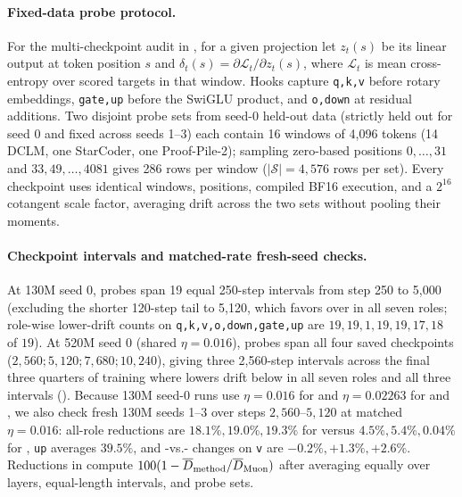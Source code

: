 \paragraph{Fixed-data probe protocol.}
For the multi-checkpoint audit in , for a given projection let $z_t(s)$ be its linear output at token position $s$ and $\delta_t(s)=\partial\mathcal L_t/\partial z_t(s)$, where $\mathcal L_t$ is mean cross-entropy over scored targets in that window. Hooks capture \texttt{q,k,v} before rotary embeddings, \texttt{gate,up} before the SwiGLU product, and \texttt{o,down} at residual additions. Two disjoint probe sets from seed-0 held-out data (strictly held out for seed 0 and fixed across seeds 1--3) each contain 16 windows of 4,096 tokens (14 DCLM, one StarCoder, one Proof-Pile-2); sampling zero-based positions $0,\ldots,31$ and $33,49,\ldots,4081$ gives 286 rows per window ($|\mathcal S|=4{,}576$ rows per set). Every checkpoint uses identical windows, positions, compiled BF16 execution, and a $2^{16}$ cotangent scale factor, averaging drift across the two sets without pooling their moments.

\paragraph{Checkpoint intervals and matched-rate fresh-seed checks.}
At 130M seed 0, probes span 19 equal 250-step intervals from step 250 to 5,000 (excluding the shorter 120-step tail to 5,120, which favors  over  in all seven roles; role-wise lower-drift counts on \texttt{q,k,v,o,down,gate,up} are $19,19,1,19,19,17,18$ of $19$). At 520M seed 0 (shared $\eta=0.016$), probes span all four saved checkpoints ($2{,}560;5{,}120;7{,}680;10{,}240$), giving three 2,560-step intervals across the final three quarters of training where  lowers drift below  in all seven roles and all three intervals (). Because 130M seed-0 runs use $\eta=0.016$ for  and $\eta=0.02263$ for  and , we also check fresh 130M seeds 1--3 over steps $2{,}560\text{--}5{,}120$ at matched $\eta=0.016$: all-role reductions are $18.1\%,19.0\%,19.3\%$ for  versus $4.5\%,5.4\%,0.04\%$ for , \texttt{up} averages $39.5\%$, and -vs.- changes on \texttt{v} are $-0.2\%,+1.3\%,+2.6\%$. Reductions in  compute $100(1-\overline D_{\rm method}/\overline D_{\rm Muon})$ after averaging equally over layers, equal-length intervals, and probe sets.

